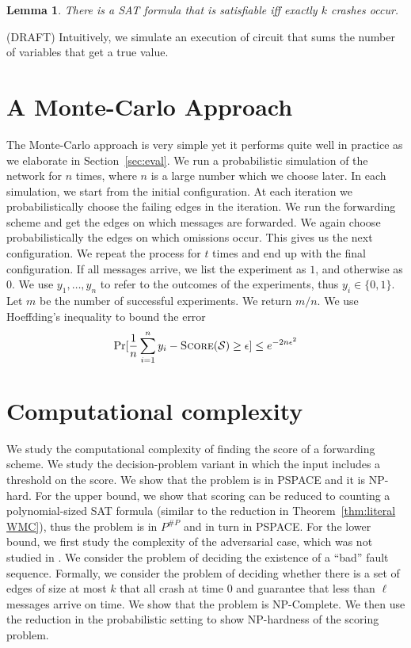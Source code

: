 \documentclass[11pt,eepic]{article}
\newcommand{\set}[1]{\{ #1  \}}
\renewcommand{\S}{{\cal S}}
\newcommand{\score}{\mbox{\sc Score}}
\newtheorem{lemma}[theorem]{Lemma}
\def\eod{\vrule height 6pt width 5pt depth 0pt}
\newenvironment{proof}{\noindent {\bf Proof:} \hspace{.677em}}
	                      {\hspace*{\fill}{\eod}}
\begin{document}
		\begin{lemma}
		\label{lem:k crash sat}
		There is a SAT formula that is satisfiable iff exactly $k$ crashes occur. 
		\end{lemma}
		\begin{proof}
		(DRAFT) Intuitively, we simulate an execution of circuit that sums the number of variables that get a true value.
		\end{proof}




\section{A Monte-Carlo Approach}
\label{sec:monte-carlo}
	The Monte-Carlo approach is very simple yet it performs quite well in practice as we elaborate in Section~\ref{sec:eval}. We run a probabilistic simulation of the network for $n$ times, where $n$ is a large number which we choose later. In each simulation, we start from the initial configuration. At each iteration we probabilistically choose the failing edges in the iteration. We run the forwarding scheme and get the edges on which messages are forwarded. We again choose probabilistically the edges on which omissions occur. This gives us the next configuration. We repeat the process for $t$ times and end up with the final configuration. If all messages arrive, we list the experiment as $1$, and otherwise as $0$. We use $y_1, \ldots, y_n$ to refer to the outcomes of the experiments, thus $y_i \in \set{0,1}$. Let $m$ be the number of successful experiments. We return $m/n$. We use Hoeffding's inequality to bound the error \[\Pr[\frac{1}{n}\sum_{i=1}^n y_i - \score(\S) \geq \epsilon] \leq e^{-2n\epsilon^2}\]





\section{Computational complexity}
	We study the computational complexity of finding the score of a forwarding scheme. We study the decision-problem variant in which the input includes a threshold on the score. We show that the problem is in PSPACE and it is NP-hard. For the upper bound, we show that scoring can be reduced to counting a polynomial-sized SAT formula (similar to the reduction in Theorem~\ref{thm:literal WMC}), thus the problem is in $P^{\#P}$ and in turn in PSPACE. For the lower bound, we first study the complexity of the adversarial case, which was not studied in \cite{AGN16}. We consider the problem of deciding the existence of a ``bad'' fault sequence. Formally, we consider the problem of deciding whether there is a set of edges of size at most $k$ that all crash at time $0$ and guarantee that less than $\ell$ messages arrive on time. We show that the problem is NP-Complete. We then use the reduction in the probabilistic setting to show NP-hardness of the scoring problem.
\end{document}
